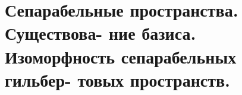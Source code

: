 \section{Сепарабельные пространства. Существова-
ние базиса. Изоморфность сепарабельных гильбер-
товых пространств.}



\newpage

